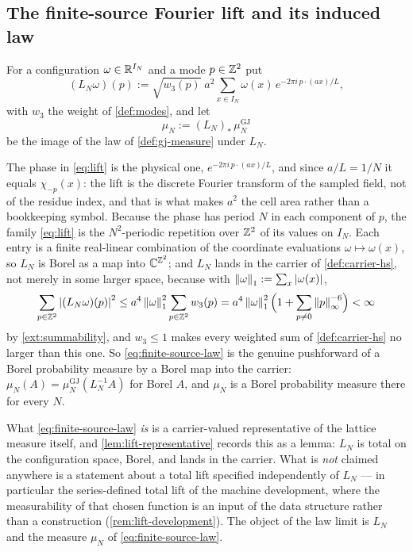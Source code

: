 \subsection{The finite-source Fourier lift and its induced law}

\begin{definition}\label{def:finite-source-lift}
For a configuration $\omega\in\mathbb{R}^{I_N}$ and a mode $p\in\mathbb{Z}^2$ put
\begin{equation}\label{eq:lift}
  (L_N\omega)(p):=\sqrt{w_3(p)}\;a^2\sum_{x\in I_N}\omega(x)\,e^{-2\pi i\,p\cdot(ax)/L},
\end{equation}
with $w_3$ the weight of \cref{def:modes}, and let
\begin{equation}\label{eq:finite-source-law}
  \mu_N:=(L_N)_*\,\mu^{\mathrm{GJ}}_N
\end{equation}
be the image of the law of \cref{def:gj-measure} under $L_N$.
\end{definition}

The phase in \eqref{eq:lift} is the physical one, $e^{-2\pi i\,p\cdot(ax)/L}$, and since $a/L=1/N$ it
equals $\chi_{-p}(x)$: the lift is the discrete Fourier transform of the sampled field, not of the residue
index, and that is what makes $a^2$ the cell area rather than a bookkeeping symbol. Because the phase has
period $N$ in each component of $p$, the family \eqref{eq:lift} is the $N^2$-periodic repetition over
$\mathbb{Z}^2$ of its values on $I_N$. Each entry is a finite real-linear combination of the coordinate
evaluations $\omega\mapsto\omega(x)$, so $L_N$ is Borel as a map into $\mathbb{C}^{\mathbb{Z}^2}$; and $L_N$ lands in the
carrier of \cref{def:carrier-hs}, not merely in some larger space, because with
$\left\| \omega \right\|_1:=\sum_x\left| \omega(x) \right|$,
\[
  \sum_{p\in\mathbb{Z}^2}\left| (L_N\omega)(p) \right|^2
  \le a^4\left\| \omega \right\|_1^2\sum_{p\in\mathbb{Z}^2}w_3(p)
  =a^4\left\| \omega \right\|_1^2\Bigl(1+\sum_{p\neq0}\left\| p \right\|_\infty^{-6}\Bigr)<\infty
\]
by \cref{ext:summability}, and $w_3\le1$ makes every weighted sum of \cref{def:carrier-hs} no larger than
this one. So \eqref{eq:finite-source-law} is the genuine pushforward of a Borel probability measure by a
Borel map into the carrier: $\mu_N(A)=\mu^{\mathrm{GJ}}_N(L_N^{-1}A)$ for Borel $A$, and $\mu_N$ is a
Borel probability measure there for every $N$.

What \eqref{eq:finite-source-law} \emph{is} is a carrier-valued representative of the lattice measure
itself, and \cref{lem:lift-representative} records this as a lemma: $L_N$ is total on the
configuration space, Borel, and lands in the carrier. What is \emph{not} claimed anywhere is a
statement about a total lift specified independently of $L_N$ --- in particular the series-defined
total lift of the machine development, where the measurability of that chosen function is an input
of the data structure rather than a construction (\cref{rem:lift-development}). The object of the
law limit is $L_N$ and the measure $\mu_N$ of \eqref{eq:finite-source-law}.

